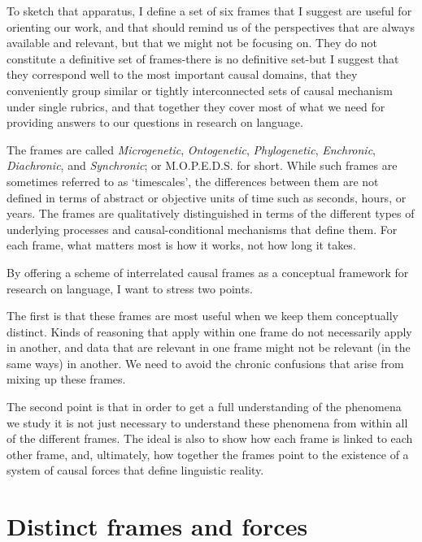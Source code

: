 To sketch that apparatus, I define a set of six frames that I suggest 
are useful for orienting our work, and that should remind us of the 
perspectives that are always available and relevant, but that we might 
not be focusing on. They do not constitute a definitive set of 
frames-there is no definitive set-but I suggest that they correspond 
well to the most important causal domains, that they conveniently group 
similar or tightly interconnected sets of causal mechanism under single 
rubrics, and that together they cover most of what we need for providing 
answers to our questions in research on language. 



The frames are called \textit{Microgenetic}, \textit{Ontogenetic}, 
\textit{Phylogenetic}, \textit{Enchronic}, \textit{Diachronic}, 
and \textit{Synchronic}; or M.O.P.E.D.S. for short. While such frames 
are sometimes referred to as \textquoteleft timescales', the differences between them 
are not defined in terms of abstract or objective units of time such as 
seconds, hours, or years. The frames are qualitatively distinguished in 
terms of the different types of underlying processes and 
causal-conditional mechanisms that define them. For each frame, what 
matters most is how it works, not how long it takes. 



By offering a scheme of interrelated causal frames as a conceptual 
framework for research on language, I want to stress two points. 



The first is that these frames are most useful when we keep them 
conceptually distinct. Kinds of reasoning that apply within one frame do 
not necessarily apply in another, and data that are relevant in one 
frame might not be relevant (in the same ways) in another. We need to 
avoid the chronic confusions that arise from mixing up these frames. 



The second point is that in order to get a full understanding of the 
phenomena we study it is not just necessary to understand these 
phenomena from within all of the different frames. The ideal is also to 
show how each frame is linked to each other frame, and, ultimately, how 
together the frames point to the existence of a system of causal forces 
that define linguistic reality.



\section{Distinct frames and forces}


